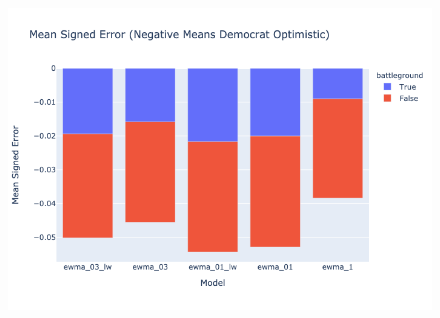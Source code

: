 

\begin{table}[H]

    \label{tab:all_models_2020-05-01-2020-10-31_mae}
\end{table}

\begin{figure}
    \centering
    \includegraphics[height=26em]{figures/ewma_03_lw_ewma_03_ewma_01_lw_ewma_01_ewma_1_mean_signed_error.png}
    \label{fig:ewma_03_lw_ewma_03_ewma_01_lw_ewma_01_ewma_1_mean_signed_error}
\end{figure}

